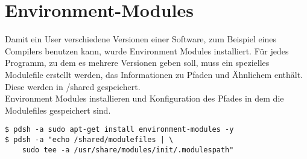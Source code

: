 \chapter{Environment-Modules}
Damit ein User verschiedene Versionen einer Software,
zum Beispiel eines Compilers benutzen kann, wurde Environment Modules installiert.
Für jedes Programm, zu dem es mehrere Versionen geben soll,
muss ein spezielles Modulefile erstellt werden,
das Informationen zu Pfaden und Ähnlichem enthält. Diese werden in /shared
gespeichert.\\
Environment Modules installieren und Konfiguration des Pfades in dem die Modulefiles
gespeichert sind.
\begin{lstlisting}[style=Bash]
$ pdsh -a sudo apt-get install environment-modules -y
$ pdsh -a "echo /shared/modulefiles | \
	sudo tee -a /usr/share/modules/init/.modulespath"
\end{lstlisting}
